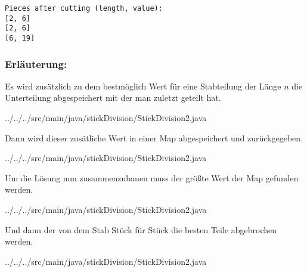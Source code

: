 \documentclass[a4paper]{article}
\newcommand{\lstquote}[2]{

{../../../src/main/java/stickDivision/StickDivision2.java}
}
\begin{document}
\begin{verbatim}
Pieces after cutting (length, value):
[2, 6]
[2, 6]
[6, 19]
\end{verbatim}

\subsubsection*{Erläuterung:}

Es wird zusätzlich zu dem bestmöglich Wert für eine Stabteilung der
Länge $n$ die Unterteilung abgespeichert mit der man zuletzt geteilt
hat.
\lstquote{18}{19}
Dann wird dieser zusätliche Wert in einer Map abgespeichert und
zurückgegeben.
\lstquote{26}{30}
Um die Lösung nun zusammenzubauen muss der größte Wert der Map gefunden
werden.
\lstquote{36}{37}
Und dann der von dem Stab Stück für Stück die besten Teile abgebrochen
werden.
\lstquote{39}{46}
\end{document}
